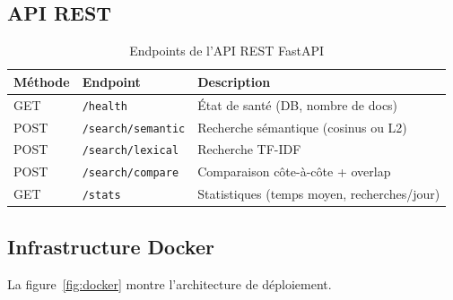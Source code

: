 \documentclass[12pt,a4paper]{article}
\begin{document}
\subsection{API REST}

\begin{table}[H]
\centering
\caption{Endpoints de l'API REST FastAPI}
\label{tab:api}
\begin{tabular}{@{}llp{6cm}@{}}
\toprule
\textbf{M\'{e}thode} & \textbf{Endpoint} & \textbf{Description} \\
\midrule
GET  & \texttt{/health}           & \'{E}tat de sant\'{e} (DB, nombre de docs) \\
POST & \texttt{/search/semantic}  & Recherche s\'{e}mantique (cosinus ou L2) \\
POST & \texttt{/search/lexical}   & Recherche TF-IDF \\
POST & \texttt{/search/compare}   & Comparaison c\^{o}te-\`{a}-c\^{o}te + overlap \\
GET  & \texttt{/stats}            & Statistiques (temps moyen, recherches/jour) \\
\bottomrule
\end{tabular}
\end{table}

\subsection{Infrastructure Docker}

La figure~\ref{fig:docker} montre l'architecture de d\'{e}ploiement.
\end{document}
